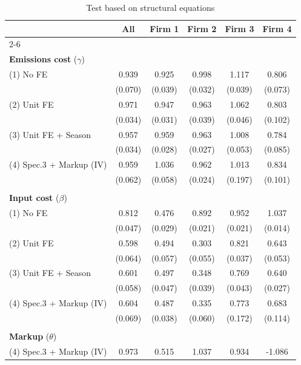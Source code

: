 \begin{table}
\centering
\caption{Test based on structural equations} \label{tab:intern_structural}

\begin{tabular*}{.9\textwidth}{@{\extracolsep{\fill}} l  c  c  c  c  c }
\\ \hline\hline 
 & \textbf{All}  & \textbf{Firm 1}  & \textbf{Firm 2}  & \textbf{Firm 3}  & \textbf{Firm 4} \\ \cline{2-6} \\[-\sep]
\textbf{Emissions cost} ($\gamma$) \\[\sep]
(1) No FE & 0.939 & 0.925 & 0.998 & 1.117 & 0.806 \\ 
 & (0.070) & (0.039) & (0.032) & (0.039) & (0.073)\\[\sep]
(2) Unit FE & 0.971 & 0.947 & 0.963 & 1.062 & 0.803 \\ 
 & (0.034) & (0.031) & (0.039) & (0.046) & (0.102)\\[\sep]
(3) Unit FE + Season & 0.957 & 0.959 & 0.963 & 1.008 & 0.784 \\ 
 & (0.034) & (0.028) & (0.027) & (0.053) & (0.085)\\[\sep]
(4) Spec.3 + Markup (IV) & 0.959 & 1.036 & 0.962 & 1.013 & 0.834 \\ 
 & (0.062) & (0.058) & (0.024) & (0.197) & (0.101)\\[\sep]
 \hline \\[-\sep]
\textbf{Input cost} ($\beta$) \\[\sep]
(1) No FE & 0.812 & 0.476 & 0.892 & 0.952 & 1.037 \\ 
 & (0.047) & (0.029) & (0.021) & (0.021) & (0.014)\\[\sep]
(2) Unit FE & 0.598 & 0.494 & 0.303 & 0.821 & 0.643 \\ 
 & (0.064) & (0.057) & (0.055) & (0.037) & (0.053)\\[\sep]
(3) Unit FE + Season & 0.601 & 0.497 & 0.348 & 0.769 & 0.640 \\ 
 & (0.058) & (0.047) & (0.039) & (0.043) & (0.027)\\[\sep]
(4) Spec.3 + Markup (IV) & 0.604 & 0.487 & 0.335 & 0.773 & 0.683 \\ 
 & (0.069) & (0.038) & (0.060) & (0.172) & (0.114)\\[\sep]
 \hline \\[-\sep]
\textbf{Markup} ($\theta$) \\[\sep]
(4) Spec.3 + Markup (IV) & 0.973 & 0.515 & 1.037 & 0.934 & -1.086 \\ 

\end{tabular*}
\end{table}
